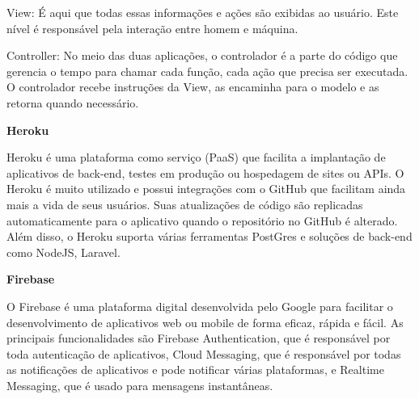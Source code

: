 	View:  %
	É aqui que todas essas informações e ações são exibidas ao usuário. Este nível é responsável pela interação entre homem e máquina.
	
	Controller: %
	No meio das duas aplicações, o controlador é a parte do código que gerencia o tempo para chamar cada função, cada ação que precisa ser executada. O controlador recebe instruções da View, as encaminha para o modelo e as retorna quando necessário.
	
	
	\textbf{Heroku}
	
	Heroku é uma plataforma como serviço (PaaS) que facilita a implantação de aplicativos de back-end, testes em produção ou hospedagem de sites ou APIs. O Heroku é muito utilizado e possui integrações com o GitHub que facilitam ainda mais a vida de seus usuários. Suas atualizações de código são replicadas automaticamente para o aplicativo quando o repositório no GitHub é alterado. Além disso, o Heroku suporta várias ferramentas PostGres e soluções de back-end como NodeJS, Laravel.
	
	\textbf{Firebase}
	
	O Firebase é uma plataforma digital desenvolvida pelo Google para facilitar o desenvolvimento de aplicativos web ou mobile de forma eficaz, rápida e fácil. As principais funcionalidades são Firebase Authentication, que é responsável por toda autenticação de aplicativos, Cloud Messaging, que é responsável por todas as notificações de aplicativos e pode notificar várias plataformas, e Realtime Messaging, que é usado para mensagens instantâneas.
	
